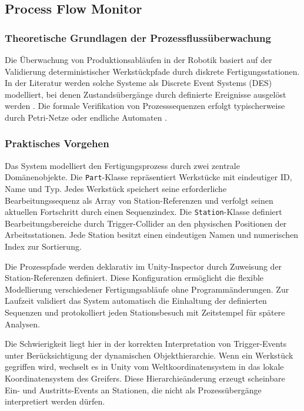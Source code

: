 \subsection{Process Flow Monitor}
\label{section:prozessfolgen}
\subsubsection{Theoretische Grundlagen der Prozessflussüberwachung}
\noindent
Die Überwachung von Produktionsabläufen in der Robotik basiert auf der Validierung
deterministischer Werkstückpfade durch diskrete Fertigungsstationen. In der
Literatur werden solche Systeme als Discrete Event Systems (DES) modelliert, bei
denen Zustandsübergänge durch definierte Ereignisse ausgelöst werden
. Die formale Verifikation von Prozesssequenzen
erfolgt typischerweise durch Petri-Netze oder endliche Automaten
.

\subsubsection{Praktisches Vorgehen}
\noindent
Das System modelliert den Fertigungsprozess durch zwei zentrale Domänenobjekte.
Die \texttt{Part}-Klasse repräsentiert Werkstücke mit eindeutiger ID, Name und
Typ. Jedes Werkstück speichert seine erforderliche Bearbeitungssequenz als
Array von Station-Referenzen und verfolgt seinen aktuellen Fortschritt durch
einen Sequenzindex. Die \texttt{Station}-Klasse definiert Bearbeitungsbereiche
durch Trigger-Collider an den physischen Positionen der Arbeitsstationen. Jede
Station besitzt einen eindeutigen Namen und numerischen Index zur Sortierung.

\noindent
Die Prozesspfade werden deklarativ im Unity-Inspector durch Zuweisung der
Station-Referenzen definiert. Diese Konfiguration ermöglicht die flexible
Modellierung verschiedener Fertigungsabläufe ohne Programmänderungen. Zur
Laufzeit validiert das System automatisch die Einhaltung der definierten
Sequenzen und protokolliert jeden Stationsbesuch mit Zeitstempel für spätere
Analysen.

\noindent
Die Schwierigkeit liegt hier in der korrekten Interpretation von
Trigger-Events unter Berücksichtigung der dynamischen Objekthierarchie. Wenn ein
Werkstück gegriffen wird, wechselt es in Unity vom Weltkoordinatensystem in das
lokale Koordinatensystem des Greifers. Diese Hierarchieänderung erzeugt
scheinbare Ein- und Austritts-Events an Stationen, die nicht als
Prozessübergänge interpretiert werden dürfen.

